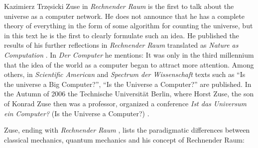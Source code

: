 \begin{artengenv}{Kazimierz Trzęsicki}
 Zuse in \emph{Rechnender Raum} \parencite*{Zuse1967} is the first to talk about the universe as a computer network. He does not announce that he has a complete theory of everything in the form of some algorithm for counting the universe, but in this text he is the first to clearly formulate such an idea. He published the results of his further reflections in \emph{Rechnender Raum} \parencite*{Zuse1969} translated as \emph{Nature as Computation} \parencite* {Zuse2012}. In \emph {Der Computer} \parencite* {Zuse2010} he mentions: 
 It was only in the third millennium that the idea of the world as a computer began to attract more attention. Among others, in \emph{Scientific American} and \emph{Spectrum der Wissenschaft} texts such as ``Is the universe a Big Computer?'', ``Is the Universe a Computer?'' are published. In the Autumn of 2006 the Technische Universit{\"a}t Berlin, where Horst Zuse, the son of Konrad Zuse then was a professor, organized a conference \emph{Ist das Universum ein Computer?} (Is the Universe a Computer?) \parencite[p.61]{German2012}.

Zuse, ending with \emph{Rechnender Raum} \parencite*[p.344]{Zuse1967}, \parencite*[p.56]{Zuse2012a} lists the paradigmatic differences between classical mechanics, quantum mechanics and his concept of Rechnender Raum:


\end{artengenv}
